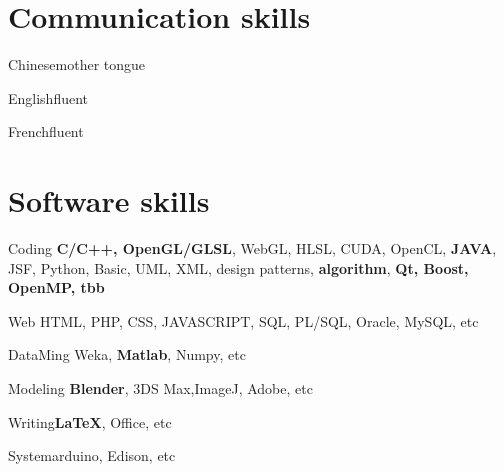 \documentclass{tccv}
\begin{document}
%
%
%
%
%
%
%

\section{Communication skills}
\begin{factlist}
\item{Chinese}{mother tongue}
\item{English}{fluent}
\item{French}{fluent}
\end{factlist}

\section{Software skills}

\begin{factlist}

\item{Coding}
     {\textbf{C/C++, OpenGL/GLSL}, WebGL, HLSL, CUDA, OpenCL, \textbf{JAVA}, JSF, Python, Basic, UML, 
XML, design patterns, \textbf{algorithm}, \textbf{Qt, Boost, OpenMP, tbb}}

\item{Web}
     {HTML, PHP, CSS, JAVASCRIPT, SQL, PL/SQL, Oracle, MySQL, etc}

\item{DataMing}
     {Weka, \textbf{Matlab}, Numpy, etc}
		
\item{Modeling}
     {\textbf{Blender}, 3DS Max,ImageJ, Adobe, etc}	

\item{Writing}{\textbf{\LaTeX}, Office, etc}

\item{System}{arduino, Edison, etc}
\end{factlist}
\end{document}
